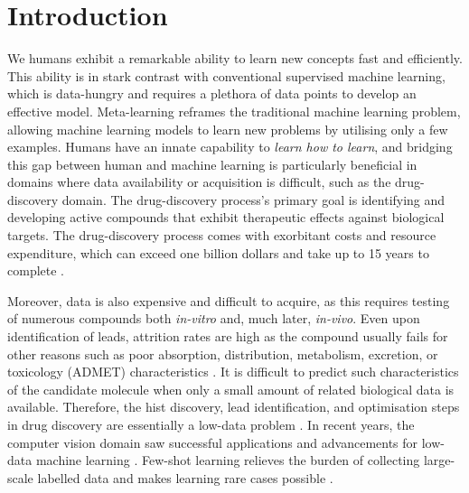 \section{Introduction}

We humans exhibit a remarkable ability to learn new concepts fast and efficiently. This ability is in stark contrast with conventional supervised machine learning, which is data-hungry and requires a plethora of data points to develop an effective model. Meta-learning reframes the traditional machine learning problem, allowing machine learning models to learn new problems by utilising only a few examples. Humans have an innate capability to \textit{learn how to learn}, and bridging this gap between human and machine learning is particularly beneficial in domains where data availability or acquisition is difficult, such as the drug-discovery domain. The drug-discovery process's primary goal is identifying and developing active compounds that exhibit therapeutic effects against biological targets. The drug-discovery process comes with exorbitant costs and resource expenditure, which can exceed one billion dollars and take up to 15 years to complete \cite{hughes2011principles}.

Moreover, data is also expensive and difficult to acquire, as this requires testing of numerous compounds both \textit{in-vitro} and, much later, \textit{in-vivo}. Even upon identification of leads, attrition rates are high as the compound usually fails for other reasons such as poor absorption, distribution, metabolism, excretion, or toxicology (ADMET) characteristics \cite{waring2015analysis}. It is difficult to predict such characteristics of the candidate molecule when only a small amount of related biological data is available. Therefore, the hist discovery, lead identification, and optimisation steps in drug discovery are essentially a low-data problem \cite{altae2017low}. In recent years, the computer vision domain saw successful applications and advancements for low-data machine learning \cite{koch2015siamese, vinyals2016matching, snell2017prototypical, sung2018learning}. Few-shot learning relieves the burden of collecting large-scale labelled data and makes learning rare cases possible \cite{wang2020generalizing}. 

